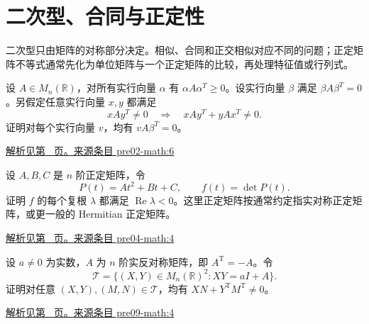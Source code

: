 \documentclass[UTF8,12pt,a4paper,fontset=fandol]{ctexart}
\begin{document}
\section{二次型、合同与正定性}

\label{sec:questions-7}

二次型只由矩阵的对称部分决定。相似、合同和正交相似对应不同的问题；正定矩阵不等式通常先化为单位矩阵与一个正定矩阵的比较，再处理特征值或行列式。

\begin{example}\label{ex:pre02-math:6}

设 $A\in M_n(\mathbb R)$，对所有实行向量 $\alpha$ 有 $\alpha A\alpha^T\ge0$。设实行向量 $\beta$ 满足 $\beta A\beta^T=0$。另假定任意实行向量 $x,y$ 都满足
\[
xAy^T\ne0\quad\Longrightarrow\quad xAy^T+yAx^T\ne0.
\]
证明对每个实行向量 $v$，均有 $vA\beta^T=0$。

\par\hyperref[ans:pre02-math:6]{解析见第~\pageref{ans:pre02-math:6} 页。}\quad\href{https://github.com/lzxcr/cmc-mathematics/blob/64916fa1fdbc3e444a652eca204d5669058ee321/src/problems/preliminary/02/06.md}{来源条目 pre02-math:6}

\end{example}

\begin{example}\label{ex:pre04-math:4}

设 $A,B,C$ 是 $n$ 阶正定矩阵，令
\[
P(t)=At^2+Bt+C,\qquad f(t)=\det P(t).
\]
证明 $f$ 的每个复根 $\lambda$ 都满足 $\operatorname{Re}\lambda<0$。这里正定矩阵按通常约定指实对称正定矩阵，或更一般的 Hermitian 正定矩阵。

\par\hyperref[ans:pre04-math:4]{解析见第~\pageref{ans:pre04-math:4} 页。}\quad\href{https://github.com/lzxcr/cmc-mathematics/blob/64916fa1fdbc3e444a652eca204d5669058ee321/src/problems/preliminary/04/04.md}{来源条目 pre04-math:4}

\end{example}

\begin{example}\label{ex:pre09-math:4}

设 $a\ne0$ 为实数，$A$ 为 $n$ 阶实反对称矩阵，即 $A^{\mathrm T}=-A$。令
\[
\mathcal T=\{(X,Y)\in M_n(\mathbb R)^2:XY=aI+A\}.
\]
证明对任意 $(X,Y),(M,N)\in\mathcal T$，均有 $XN+Y^{\mathrm T}M^{\mathrm T}\ne0$。

\par\hyperref[ans:pre09-math:4]{解析见第~\pageref{ans:pre09-math:4} 页。}\quad\href{https://github.com/lzxcr/cmc-mathematics/blob/64916fa1fdbc3e444a652eca204d5669058ee321/src/problems/preliminary/09/04.md}{来源条目 pre09-math:4}

\end{example}
\end{document}
